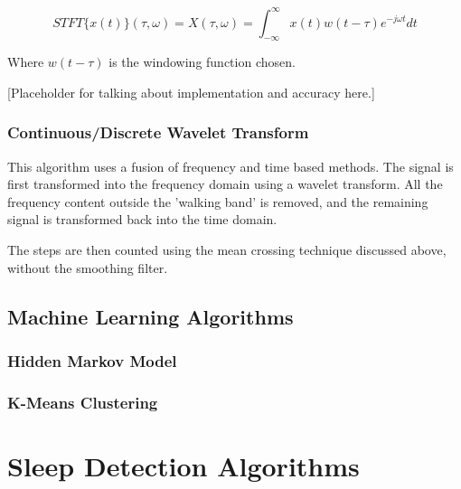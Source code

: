                     \begin{equation}
                        STFT\{x(t)\}(\tau,\omega) = X(\tau,\omega) = \int_{-\infty}^{\infty}x(t)w(t-\tau)e^{-j\omega t}dt
                    \end{equation}

                    Where $w(t-\tau)$ is the windowing function chosen.

                    [Placeholder for talking about implementation and accuracy here.]

                \subsubsection{Continuous/Discrete Wavelet Transform}

                    This algorithm uses a fusion of frequency and time based methods. The signal is first transformed into the frequency domain using a wavelet transform. All the frequency content outside the 'walking band' is removed, and the remaining signal is transformed back into the time domain.

                    The steps are then counted using the mean crossing technique discussed above, without the smoothing filter.

            \subsection{Machine Learning Algorithms}

                \subsubsection{Hidden Markov Model}

                \subsubsection{K-Means Clustering}

        \section{Sleep Detection Algorithms}